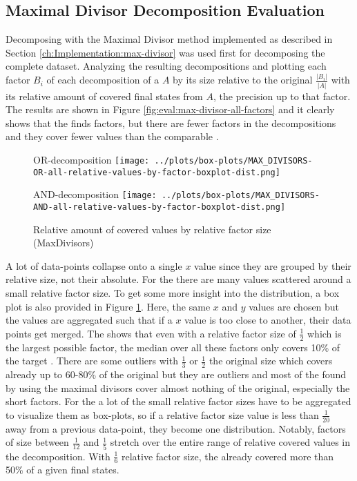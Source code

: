 \subsection{Maximal Divisor Decomposition Evaluation}
\label{ch:Evaluation:decomposition-quality:max-divisor}
Decomposing with the Maximal Divisor method implemented as described in Section \ref{ch:Implementation:max-divisor} was used first for decomposing the complete dataset.
Analyzing the resulting decompositions and plotting each factor $B_i$ of each decomposition of a \DFA $A$ by its size relative to the original $\frac{|B_i|}{|A|}$ with its relative amount of covered final states from $A$, the precision up to that factor.
The results are shown in Figure \ref{fig:eval:max-divisor-all-factors} and it clearly shows that the \orDecomp finds factors, but there are fewer factors in the decompositions and they cover fewer values than the comparable \andDecomp.
\begin{figure}[h]
	\begin{minipage}[h]{0.49\linewidth}
		\centering
		OR-decomposition
		\texttt{[image: ../plots/box-plots/MAX\_DIVISORS-OR-all-relative-values-by-factor-boxplot-dist.png]}
	\end{minipage}
	\begin{minipage}[h]{0.49\linewidth}
		\centering
		AND-decomposition
		\texttt{[image: ../plots/box-plots/MAX\_DIVISORS-AND-all-relative-values-by-factor-boxplot-dist.png]}
	\end{minipage}
	\caption{Relative amount of covered values by relative factor size (MaxDivisors)}
	\label{fig:eval:max-divisor-all-factors-box-plot}
\end{figure}
A lot of data-points collapse onto a single $x$ value since they are grouped by their relative size, not their absolute.
For the \andDecomp there are many values scattered around a small relative factor size.
To get some more insight into the distribution, a box plot is also provided in Figure \ref{fig:eval:max-divisor-all-factors-box-plot}.
Here, the same $x$ and $y$ values are chosen but the values are aggregated such that if a $x$ value is too close to another, their data points get merged.
The \orDecomp shows that even with a relative factor size of $\frac{1}{2}$ which is the largest possible factor, the median over all these factors only covers 10\% of the target \DFA.
There are some outliers with $\frac{1}{3}$ or $\frac{1}{2}$ the original size which covers already up to 60-80\% of the original \DFA but they are outliers and most of the \orDecomp found by using the maximal divisors cover almost nothing of the original, especially the short factors.
For the \andDecomp a lot of the small relative factor sizes have to be aggregated to visualize them as box-plots, so if a relative factor size value is less than $\frac{1}{20}$ away from a previous data-point, they become one distribution.
Notably, factors of size between $\frac{1}{12}$ and $\frac{1}{5}$ stretch over the entire range of relative covered values in the decomposition. With $\frac{1}{6}$ relative factor size, the \andDecomp already covered more than 50\% of a given \DFAs final states.

